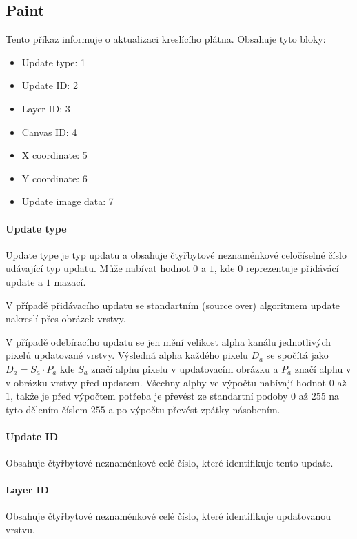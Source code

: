 \documentclass[12pt,oneside,a4paper]{report}
\begin{document}
\subsection{Paint}

Tento příkaz informuje o aktualizaci kreslícího plátna. Obsahuje tyto bloky:

\begin{itemize}
	\item Update type: 1
	\item Update ID: 2
	\item Layer ID: 3
	\item Canvas ID: 4
	\item X coordinate: 5
	\item Y coordinate: 6
	\item Update image data: 7						
\end{itemize}

\paragraph{Update type}
Update type je typ updatu a obsahuje čtyřbytové neznaménkové celočíselné číslo udávající typ updatu. Může nabívat hodnot $0$ a $1$, kde $0$ reprezentuje přidávácí update a $1$ mazací.

V případě přidávacího updatu se standartním (source over) algoritmem update nakreslí přes obrázek vrstvy. 

V případě odebíracího updatu se jen mění velikost alpha kanálu jednotlivých pixelů updatované vrstvy. Výsledná alpha každého pixelu $D_{a}$ se spočítá jako $D_{a} = S_{a} \cdot P_{a}$ kde $S_{a}$ značí alphu pixelu v updatovacím obrázku a $P_{a}$ značí alphu v v obrázku vrstvy před updatem. Všechny alphy ve výpočtu nabívají hodnot $0$ až $1$, takže je před výpočtem potřeba je převést ze standartní podoby $0$ až $255$ na tyto dělením číslem $255$ a po výpočtu převést zpátky násobením.

\paragraph{Update ID}
Obsahuje čtyřbytové neznaménkové celé číslo, které identifikuje tento update.

\paragraph{Layer ID}
Obsahuje čtyřbytové neznaménkové celé číslo, které identifikuje updatovanou vrstvu.
\end{document}
